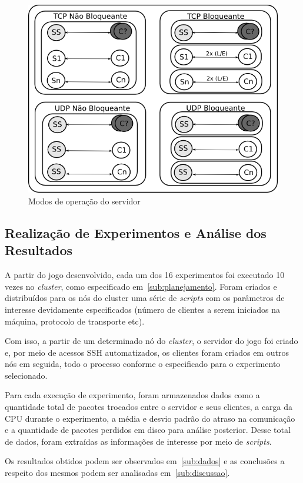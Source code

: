 \documentclass[12pt]{article}
\begin{document}
\begin{figure}[ht]
\centering
\includegraphics[width=.8\textwidth]{img/server.png}
\caption{Modos de operação do servidor}
\label{fig:server}
\end{figure}

\subsection{Realização de Experimentos e Análise dos Resultados} \label{sub:realizacao}

A partir do jogo desenvolvido, cada um dos 16 experimentos foi executado 10
vezes no \textit{cluster}, como especificado em~\ref{sub:planejamento}. Foram
criados e distribuídos para os nós do cluster uma série de \textit{scripts}
com os parâmetros de interesse devidamente especificados (número de clientes a
serem iniciados na máquina, protocolo de transporte etc).

Com isso, a partir de um determinado nó do \textit{cluster}, o servidor do jogo
foi criado e, por meio de acessos SSH automatizados, os clientes foram criados
em outros nós em seguida, todo o processo conforme o especificado para o
experimento selecionado.

Para cada execução de experimento, foram armazenados dados como a quantidade
total de pacotes trocados entre o servidor e seus clientes, a carga da CPU
durante o experimento, a média e desvio padrão do atraso na comunicação e a
quantidade de pacotes perdidos em disco para análise posterior. Desse total de
dados, foram extraídas as informações de interesse por meio de
\textit{scripts}.

Os resultados obtidos podem ser observados em~\ref{sub:dados} e as conclusões a
respeito dos mesmos podem ser analisadas em~\ref{sub:discussao}.
\end{document}
